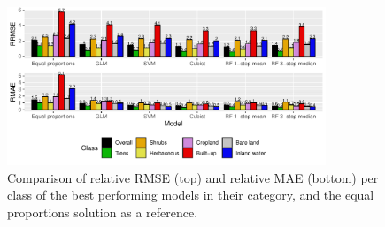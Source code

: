 \documentclass[review,authoryear,3p]{elsarticle}
\begin{document}
\begin{figure}
    \includegraphics[width=0.85\textwidth]{article-figures/barplots/2020-11-02-model-comparison-bar}
    \caption{Comparison of relative RMSE (top) and relative MAE (bottom) per class of the best performing models in their category, and the equal proportions solution as a reference.}
    \label{fig-models-relative}
\end{figure}


\end{document}
